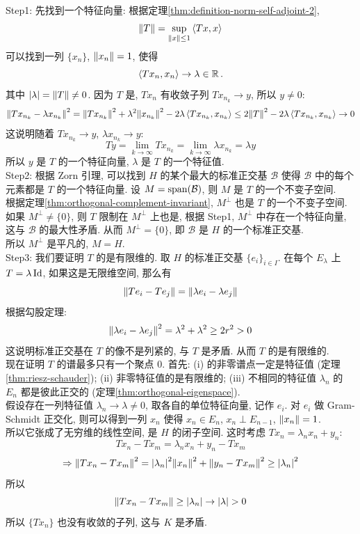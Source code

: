         \begin{prf}
            Step1: 先找到一个特征向量: 根据定理\ref{thm:definition-norm-self-adjoint-2}, 
            \[\norm{T}=\sup_{\norm{x}\leq 1}\expval{Tx, x}\]
            可以找到一列 \(\{x_n\}\), \(\norm{x_n}=1\), 使得
            \[\expval{Tx_n, x_n}\to\lambda\in\operatorname{\mathbb{R}}.\]
            其中 \(|\lambda|=\norm{T}\neq 0\). 因为 \(T\) 是\CompactOp{}, \(T x_n\) 有收敛子列 \(Tx_{n_k}\to y\), 所以 \(y\neq 0\):
            \[\norm{Tx_{n_k}-\lambda x_{n_k}}^2 = \norm{Tx_{n_k}}^2+\lambda^2\norm{x_{n_k}}^2-2\lambda\expval{Tx_{n_k}, x_{n_k}}\leq 2\norm{T}^2-2\lambda\expval{Tx_{n_k}, x_{n_k}}\to 0\]
            这说明随着 \(Tx_{n_k}\to y\), \(\lambda x_{n_k}\to y\):
            \[T y = \lim_{k\to\infty} T x_{n_k} = \lim_{k\to\infty} \lambda x_{n_k} = \lambda y\]
            所以 \(y\) 是 \(T\) 的一个特征向量, \(\lambda\) 是 \(T\) 的一个特征值.\\
            Step2: 根据 Zorn 引理, 可以找到 \(H\) 的某个最大的标准正交基 \(\mathcal{B}\) 使得 \(\mathcal{B}\) 中的每个元素都是 \(T\) 的一个特征向量. 设 \(M=\operatorname{span}(\mathcal{B})\), 则 \(M\) 是 \(T\) 的一个不变子空间. \\
            根据定理\ref{thm:orthogonal-complement-invariant}, \(M^\perp\) 也是 \(T\) 的一个不变子空间. 如果 \(M^\perp\neq \{0\}\), 则 \(T\) 限制在 \(M^\perp\) 上也是\SelfAdjOp{}, 根据 Step1, \(M^\perp\) 中存在一个特征向量, 这与 \(\mathcal{B}\) 的最大性矛盾. 从而 \(M^\perp=\{0\}\), 即 \(\mathcal{B}\) 是 \(H\) 的一个标准正交基.\\
            所以 \(M^\perp\) 是平凡的, \(M=H\).\\
            Step3: 我们要证明 \(T\) 的\Eigenspace{}是有限维的. 取 \(H\) 的标准正交基 \(\{e_i\}_{i\in I}\). 在每个\Eigenspace{} \(E_\lambda\) 上 \(T=\lambda\operatorname{Id}\), 如果这是无限维空间, 那么有
            \[\norm{Te_i-Te_j}=\norm{\lambda e_i - \lambda e_j}\]
            根据勾股定理:
            \[\norm{\lambda e_i - \lambda e_j}^2=\lambda^2+\lambda^2\geq 2r^2 >0\]
            这说明标准正交基在 \(T\) 的像不是列紧的, 与 \(T\) 是\CompactOp{}矛盾. 从而 \(T\) 的\Eigenspace{}是有限维的.\\
            现在证明 \(T\) 的谱最多只有一个聚点 \(0\). 首先: (i) \CompactOp{}的非零谱点一定是特征值 (定理\ref{thm:riesz-schauder}); (ii) 非零特征值的\Eigenspace{}是有限维的; (iii) 不相同的特征值 \(\lambda_n\) 的\Eigenspace{} \(E_n\) 都是彼此正交的 (定理\ref{thm:orthogonal-eigenspace}).\\
            假设存在一列特征值 \(\lambda_n\to\lambda\neq 0\), 取各自的单位特征向量, 记作 \(e_i\). 对 \(e_i\) 做 Gram-Schmidt 正交化, 则可以得到一列 \(x_n\) 使得 \(x_n\in E_n\), \(x_n\perp E_{n-1}\), \(\norm{x_n}=1\).\\
            所以它张成了无穷维的线性空间, 是 \(H\) 的闭子空间. 这时考虑 \(Tx_n=\lambda_n x_n+y_n\):
            \[Tx_n-Tx_m=\lambda_n x_n+y_n-Tx_m\]
            \[\Rightarrow\norm{Tx_n-Tx_m}^2=\abs{\lambda_n}^2\norm{x_n}^2 + \norm{y_n-Tx_m}^2\geq \abs{\lambda_n}^2 \]
            所以
            \[\norm{Tx_n-Tx_m}\geq \abs{\lambda_n}\to\abs{\lambda} >0\]
            所以 \(\{Tx_n\}\) 也没有收敛的子列, 这与 \(K\) 是\CompactOp{}矛盾.\\
        \end{prf}


